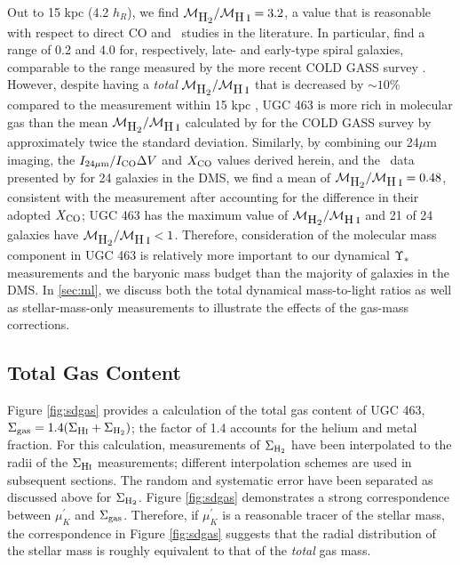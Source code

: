 \documentclass[apj,iop,numberedappendix]{emulateapj}
\begin{document}
Out to 15 kpc (4.2 $h_R$), we find $\mathcal{M}_{\mbox{H$_2$}}/\mathcal{M}_{\mbox{H{\scshape$~\!$i}}} = 3.2$, a value that is reasonable
with respect to direct CO and \hone\ studies in the literature.   In particular,
\citet{1989ApJ...347L..55Y} find a range of 0.2 and 4.0 for, respectively, late-
and early-type spiral galaxies, comparable to the range measured by the more
recent COLD GASS survey \citep{2011MNRAS.415...32S}.  However, despite having a
{\it total} $\mathcal{M}_{\mbox{H$_2$}}/\mathcal{M}_{\mbox{H{\scshape$~\!$i}}}$ that is decreased by $\sim10$\% compared to the
measurement within 15 kpc \citep{TPKMPhD}, UGC 463 is more rich in molecular gas
than the mean $\mathcal{M}_{\mbox{H$_2$}}/\mathcal{M}_{\mbox{H{\scshape$~\!$i}}}$ calculated by \citet{2011MNRAS.415...32S} for the COLD
GASS survey by approximately twice the standard deviation.  Similarly, by
combining our 24$\mu$m imaging, the $I_{24\mu{\rm m}}/I_{\rm CO}\Delta V$ and $X_{\rm CO}$ values derived
herein, and the \hone\ data presented by \citet{TPKMPhD} for 24 galaxies in the
DMS, we find a mean of $\mathcal{M}_{\mbox{H$_2$}}/\mathcal{M}_{\mbox{H{\scshape$~\!$i}}} = 0.48$, consistent with the
\citet{2011MNRAS.415...32S} measurement after accounting for the difference in
their adopted $X_{\rm CO}$; UGC 463 has the maximum value of $\mathcal{M}_{\mbox{H$_2$}}/\mathcal{M}_{\mbox{H{\scshape$~\!$i}}}$ and 21 of 24
galaxies have $\mathcal{M}_{\mbox{H$_2$}}/\mathcal{M}_{\mbox{H{\scshape$~\!$i}}} < 1$.  Therefore, consideration of the molecular mass
component in UGC 463 is relatively more important to our dynamical $\Upsilon_\ast$
measurements and the baryonic mass budget than the majority of galaxies in the
DMS.  In \sect \ref{sec:ml}, we discuss both the total dynamical mass-to-light
ratios as well as stellar-mass-only measurements to illustrate the effects of
the gas-mass corrections.

\subsection{Total Gas Content}
\label{sec:totgas}

Figure \ref{fig:sdgas} provides a calculation of the total gas content of UGC
463, $\Sigma_{\rm gas} =1.4(\Sigma_{\mbox{\rm \footnotesize H{\scshape i}}}+\Sigma_{\rm H_2})$; the factor of 1.4 accounts for the helium and
metal fraction.  For this calculation, measurements of $\Sigma_{\rm H_2}$ have been
interpolated to the radii of the $\Sigma_{\mbox{\rm \footnotesize H{\scshape i}}}$ measurements; different interpolation
schemes are used in subsequent sections.  The random and systematic error have
been separated as discussed above for $\Sigma_{\rm H_2}$.  Figure \ref{fig:sdgas}
demonstrates a strong correspondence between $\mu^{\prime}_K$ and $\Sigma_{\rm gas}$.
Therefore, if $\mu^{\prime}_K$ is a reasonable tracer of the stellar mass, the
correspondence in Figure \ref{fig:sdgas} suggests that the radial distribution
of the stellar mass is roughly equivalent to that of the {\it total} gas mass.
\end{document}
